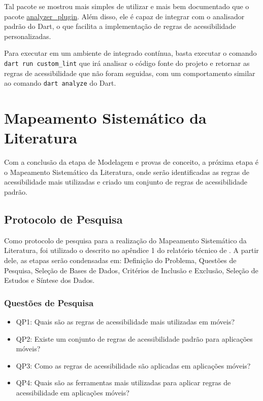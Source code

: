 Tal pacote se mostrou mais simples de utilizar e mais bem documentado que o pacote \href{https://pub.dev/packages/analyzer_plugin}{analyzer\_plugin}. Além disso, ele é capaz de integrar com o analisador padrão do Dart, o que facilita a implementação de regras de acessibilidade personalizadas. 

Para executar em um ambiente de integrado contínua, basta executar o comando \texttt{dart run custom\_lint} que irá analisar o código fonte do projeto e retornar as regras de acessibilidade que não foram seguidas, com um comportamento similar ao comando \texttt{dart analyze} do Dart.

\section{Mapeamento Sistemático da Literatura}\label{sec:msl}

Com a conclusão da etapa de Modelagem e provas de conceito, a próxima etapa é o Mapeamento Sistemático da Literatura, onde serão identificadas as regras de acessibilidade mais utilizadas e criado um conjunto de regras de acessibilidade padrão.

\subsection{Protocolo de Pesquisa}

Como protocolo de pesquisa para a realização do Mapeamento Sistemático da Literatura, foi utilizado o descrito no apêndice 1 do relatório técnico de \cite{srufrj}. A partir dele, as etapas serão condensadas em: Definição do Problema, Questões de Pesquisa, Seleção de Bases de Dados, Critérios de Inclusão e Exclusão, Seleção de Estudos e Síntese dos Dados.

\subsubsection{Questões de Pesquisa}

\begin{itemize}
	\item QP1: Quais são as regras de acessibilidade mais utilizadas em móveis?
	\item QP2: Existe um conjunto de regras de acessibilidade padrão para aplicações móveis?
	\item QP3: Como as regras de acessibilidade são aplicadas em aplicações móveis?
	\item QP4: Quais são as ferramentas mais utilizadas para aplicar regras de acessibilidade em aplicações móveis?
\end{itemize}

